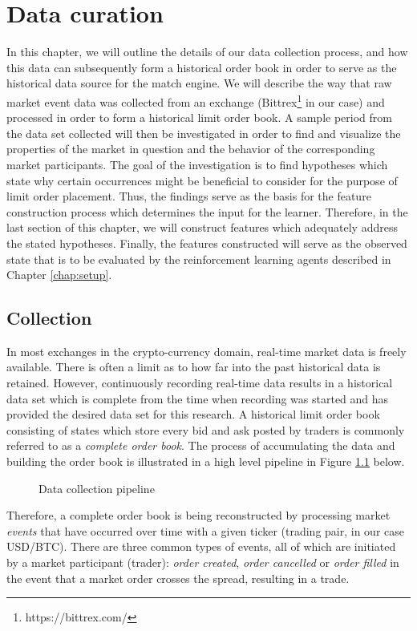 \chapter{Data curation}
\label{chap:data}

In this chapter, we will outline the details of our data collection process, and how this data can subsequently form a historical order book in order to serve as the historical data source for the match engine.
We will describe the way that raw market event data was collected from an exchange (Bittrex\footnote{https://bittrex.com/} in our case) and processed in order to form a historical limit order book.
A sample period from the data set collected will then be investigated in order to find and visualize the properties of the market in question and the behavior of the corresponding market participants.
The goal of the investigation is to find hypotheses which state why certain occurrences might be beneficial to consider for the purpose of limit order placement.
Thus, the findings serve as the basis for the feature construction process which determines the input for the learner.
Therefore, in the last section of this chapter, we will construct features which adequately address the stated hypotheses.
Finally, the features constructed will serve as the observed state that is to be evaluated by the reinforcement learning agents described in Chapter \ref{chap:setup}.

\section{Collection}
\label{sec:data-collection}

In most exchanges in the crypto-currency domain, real-time market data is freely available. 
There is often a limit as to how far into the past historical data is retained.
However, continuously recording real-time data results in a historical data set which is complete from the time when recording was started and has provided the desired data set for this research.
A historical limit order book consisting of states which store every bid and ask posted by traders is commonly referred to as a \textit{complete order book}.
The process of accumulating the data and building the order book is illustrated in a high level pipeline in Figure \ref{fig:data-pipeline} below.
\begin{figure}[H]
    \centering
    \caption{Data collection pipeline}
    \label{fig:data-pipeline}
\end{figure}
Therefore, a complete order book is being reconstructed by processing market \textit{events} that have occurred over time with a given ticker (trading pair, in our case USD/BTC).
There are three common types of events, all of which are initiated by a market participant (trader): \textit{order created}, \textit{order cancelled} or \textit{order filled} in the event that a market order crosses the spread, resulting in a trade.


